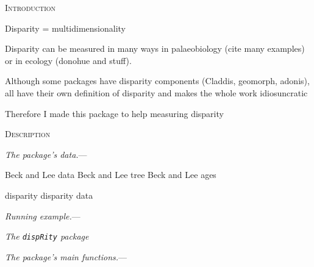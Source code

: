 \documentclass[12pt,letterpaper]{article}
\renewcommand{\section}[1]{%
\bigskip
\begin{center}
\begin{Large}
\normalfont\scshape #1
\medskip
\end{Large}
\end{center}}
\renewcommand{\subsection}[1]{%
\bigskip
\begin{center}
\begin{large}
\normalfont\itshape #1
\end{large}
\end{center}}
\renewcommand{\subsubsection}[1]{%
\vspace{2ex}
\noindent
\textit{#1.}---}
\begin{document}
\vspace{1.5in}

\newpage 

%
%

\section{Introduction}
Disparity = multidimensionality

Disparity can be measured in many ways in palaeobiology (cite many examples) or in ecology (donohue and stuff).

Although some packages have disparity components (Claddis, geomorph, adonis), all have their own definition of disparity and makes the whole work idiosuncratic

Therefore I made this package to help measuring disparity

\section{Description}

\subsubsection{The package's data}

Beck and Lee data
Beck and Lee tree
Beck and Lee ages

disparity  disparity data

\subsubsection{Running example}


\subsection{The \texttt{dispRity} package}

\subsubsection{The package's main functions}
\end{document}
